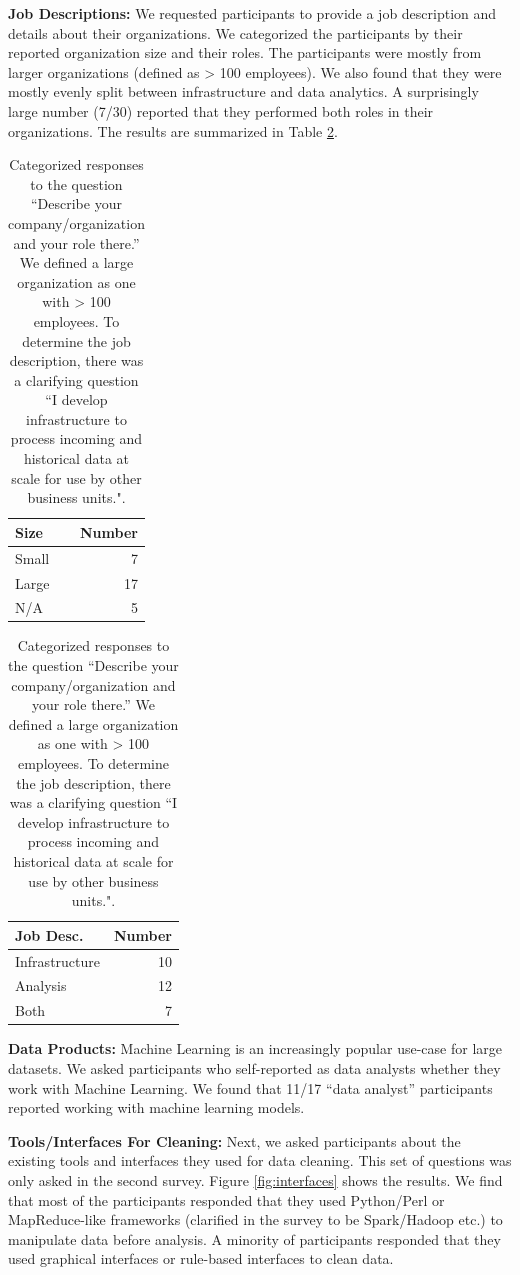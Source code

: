 \vspace{0.5em}

\noindent\textbf{Job Descriptions: } We requested participants to provide a job description and details about their organizations. We categorized the participants by their reported organization size and their roles. The participants were mostly from larger organizations (defined as > 100 employees). We also found that they were mostly evenly split between infrastructure and data analytics. A surprisingly large number (7/30) reported that they performed both roles in their organizations. The results are summarized in Table \ref{tab:jobs}. 

\begin{table}[t]
\centering
\begin{tabular}{|l|r|}
\hline
Size                               & Number \\
\hline
Small    & 7      \\
\hline
Large & 17     \\
\hline
N/A                                & 5\\  \hline  
\end{tabular}
\quad
\begin{tabular}{|l|r|}
\hline
Job Desc.                              & Number \\
\hline
Infrastructure    & 10      \\
\hline
Analysis & 12     \\
\hline
Both                                & 7\\  \hline  
\end{tabular}

\caption{Categorized responses to the question ``Describe your company/organization and your role there.'' We defined a large organization as one with > 100 employees. To determine the job description, there was a clarifying question ``I develop infrastructure to process incoming and historical data at scale for use by other business units.". \label{tab:jobs}}
\end{table}

\vspace{0.5em}
\noindent\textbf{Data Products: } Machine Learning is an increasingly popular use-case for large datasets. We asked participants who self-reported as data analysts whether they work with Machine Learning. We found that 11/17 ``data analyst'' participants reported working with machine learning models.

\vspace{0.5em}
\noindent\textbf{Tools/Interfaces For Cleaning: } Next, we asked participants about the existing tools and interfaces they used for data cleaning. This set of questions was only asked in the second survey. Figure \ref{fig:interfaces} shows the results. We find that most of the participants responded that they used Python/Perl or MapReduce-like frameworks (clarified in the survey to be Spark/Hadoop etc.) to manipulate data before analysis. A minority of participants responded that they used graphical interfaces or rule-based interfaces to clean data.

